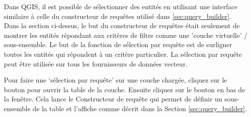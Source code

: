 Dans QGIS, il est possible de sélectionner des entités en utilisant une interface similaire à celle du constructeur de requêtes utilisé dans \ref{sec:query_builder}. Dans la section ci-dessus, le but du constructeur de requêtes était seulement de montrer les entités répondant aux critères de filtre comme une 'couche virtuelle' / sous-ensemble. Le but de la fonction de sélection par requête est de surligner toutes les entités qui répondent à un critère particulier. La sélection par requête peut être utilisée sur tous les fournisseurs de données vecteur.

Pour faire une `sélection par requête' sur une couche chargée, cliquez sur le bouton  pour ouvrir la table de la couche. Ensuite cliquez sur le bouton  en bas de la fenêtre. Cela lance le Constructeur de requête qui permet de définir un sous-ensemble de la table et l'affiche comme décrit dans la Section \ref{sec:query_builder}.


